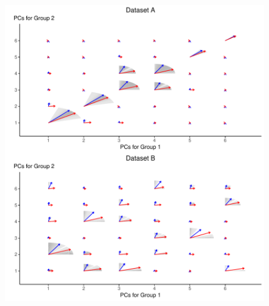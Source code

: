 \documentclass[]{interact}
\theoremstyle{plain}%
\theoremstyle{definition}
\theoremstyle{remark}
\begin{document}
\begin{figure}[H]
\center
\includegraphics[scale=0.8]{Figure3_PCADSC_v3.pdf}
\caption{}%
\label{plot.simAngle}
\end{figure}
\end{document}
